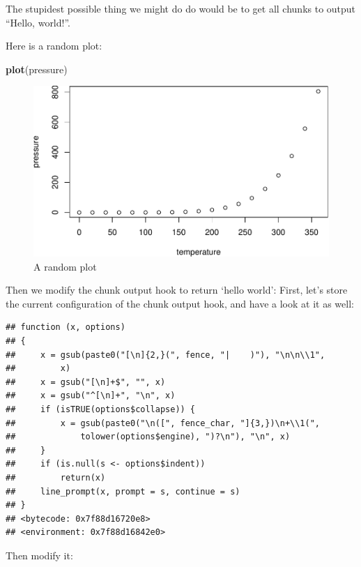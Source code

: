 \documentclass[sigchi, ]{acmart}
\newenvironment{Shaded}{\begin{snugshade}}{\end{snugshade}}
\newcommand{\ControlFlowTok}[1]{\textcolor[rgb]{0.13,0.29,0.53}{\textbf{#1}}}
\newcommand{\DataTypeTok}[1]{\textcolor[rgb]{0.13,0.29,0.53}{#1}}
\newcommand{\KeywordTok}[1]{\textcolor[rgb]{0.13,0.29,0.53}{\textbf{#1}}}
\newcommand{\NormalTok}[1]{#1}
\newcommand{\OperatorTok}[1]{\textcolor[rgb]{0.81,0.36,0.00}{\textbf{#1}}}
\newcommand{\StringTok}[1]{\textcolor[rgb]{0.31,0.60,0.02}{#1}}
\begin{document}
The stupidest possible thing we might do do would be to get all chunks to output ``Hello, world!''.

Here is a random plot:

\begin{Shaded}
\begin{Highlighting}[]
\KeywordTok{plot}\NormalTok{(pressure)}
\end{Highlighting}
\end{Shaded}

\begin{figure}
\centering
\includegraphics{how-to-create-your-own-chunk-options-in-r-markdown_files/figure-latex/random-plot-1.pdf}
\caption{\label{fig:random-plot}A random plot}
\end{figure}

Then we modify the chunk output hook to return `hello world':
First, let's store the current configuration of the chunk output hook, and have a look at it as well:

\begin{verbatim}
## function (x, options) 
## {
##     x = gsub(paste0("[\n]{2,}(", fence, "|    )"), "\n\n\\1", 
##         x)
##     x = gsub("[\n]+$", "", x)
##     x = gsub("^[\n]+", "\n", x)
##     if (isTRUE(options$collapse)) {
##         x = gsub(paste0("\n([", fence_char, "]{3,})\n+\\1(", 
##             tolower(options$engine), ")?\n"), "\n", x)
##     }
##     if (is.null(s <- options$indent)) 
##         return(x)
##     line_prompt(x, prompt = s, continue = s)
## }
## <bytecode: 0x7f88d16720e8>
## <environment: 0x7f88d16842e0>
\end{verbatim}

Then modify it:

\begin{Shaded}
\end{Shaded}
\end{document}
